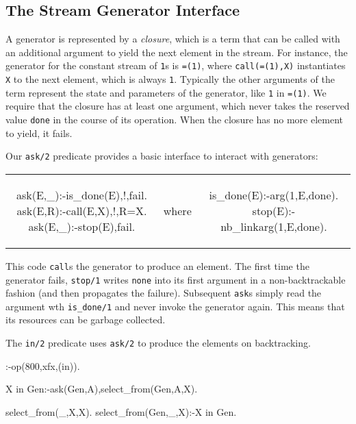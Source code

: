 \documentclass{new_tlp}
\begin{document}
\subsection{The Stream Generator Interface}

A generator is represented by a \emph{closure}, which is a term that can be
called with an additional argument to yield the next element in the stream. For
instance, the generator for the constant stream of \texttt{1}s is
\texttt{=(1)}, where \texttt{call(=(1),X)} instantiates \texttt{X} to the next
element, which is always \texttt{1}.  Typically the other arguments of the term
represent the state and parameters of the generator, like \texttt{1} in
\texttt{=(1)}. We require that the closure has at least one argument, which
never takes the reserved value \texttt{done} in the course of its operation.
When the closure has no more element to yield, it fails.

Our {\tt ask/2} predicate provides a basic interface to interact with generators:\\
\begin{tabular}{ccc}
\begin{minipage}{0.4\textwidth}
\begin{code}
ask(E,_):-is_done(E),!,fail.
ask(E,R):-call(E,X),!,R=X.
ask(E,_):-stop(E),fail.
\end{code}
\end{minipage}
&
where
&
\begin{minipage}{0.4\textwidth}
\begin{code}
is_done(E):-arg(1,E,done).
stop(E):-nb_linkarg(1,E,done).
\end{code}
\end{minipage}
\end{tabular}
This code {\tt call}s the generator to produce an element. The first time the
generator fails, \texttt{stop/1} writes \texttt{none} into its first argument
in a non-backtrackable fashion (and then propagates the failure). Subsequent 
{\tt ask}s simply read the argument wth \texttt{is\_done/1} and never invoke
the generator again. This means that its resources can be garbage collected.

The {\tt in/2} predicate uses {\tt ask/2} to produce the elements on backtracking.
\begin{code}
:-op(800,xfx,(in)).

X in Gen:-ask(Gen,A),select_from(Gen,A,X).

select_from(_,X,X).
select_from(Gen,_,X):-X in Gen.
\end{code}
\end{document}
